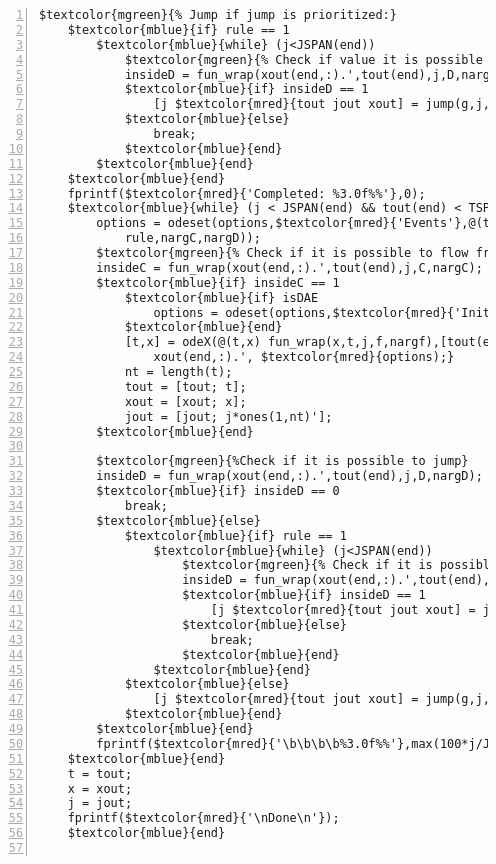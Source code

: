 \begin{Verbatim}[commandchars=\$\{\},numbers=left,numbersep=2pt]
    $textcolor{mgreen}{% Jump if jump is prioritized:} 
    $textcolor{mblue}{if} rule == 1 
        $textcolor{mblue}{while} (j<JSPAN(end)) 
            $textcolor{mgreen}{% Check if value it is possible to jump current position} 
            insideD = fun_wrap(xout(end,:).',tout(end),j,D,nargD); 
            $textcolor{mblue}{if} insideD == 1 
                [j $textcolor{mred}{tout jout xout] = jump(g,j,tout,jout,xout,nargg);} 
            $textcolor{mblue}{else} 
                break; 
            $textcolor{mblue}{end} 
        $textcolor{mblue}{end} 
    $textcolor{mblue}{end} 
    fprintf($textcolor{mred}{'Completed: %3.0f%%'},0); 
    $textcolor{mblue}{while} (j < JSPAN(end) && tout(end) < TSPAN(end)) 
        options = odeset(options,$textcolor{mred}{'Events'},@(t,x) zeroevents(x,t,j,C,D,... 
            rule,nargC,nargD)); 
        $textcolor{mgreen}{% Check if it is possible to flow from current position} 
        insideC = fun_wrap(xout(end,:).',tout(end),j,C,nargC); 
        $textcolor{mblue}{if} insideC == 1 
            $textcolor{mblue}{if} isDAE 
                options = odeset(options,$textcolor{mred}{'InitialSlope'},f(xout(end,:).',tout(end))); 
            $textcolor{mblue}{end} 
            [t,x] = odeX(@(t,x) fun_wrap(x,t,j,f,nargf),[tout(end) tfinal],... 
                xout(end,:).', $textcolor{mred}{options);} 
            nt = length(t); 
            tout = [tout; t]; 
            xout = [xout; x]; 
            jout = [jout; j*ones(1,nt)']; 
        $textcolor{mblue}{end} 
         
        $textcolor{mgreen}{%Check if it is possible to jump} 
        insideD = fun_wrap(xout(end,:).',tout(end),j,D,nargD); 
        $textcolor{mblue}{if} insideD == 0 
            break; 
        $textcolor{mblue}{else} 
            $textcolor{mblue}{if} rule == 1 
                $textcolor{mblue}{while} (j<JSPAN(end)) 
                    $textcolor{mgreen}{% Check if it is possible to jump from current position} 
                    insideD = fun_wrap(xout(end,:).',tout(end),j,D,nargD); 
                    $textcolor{mblue}{if} insideD == 1 
                        [j $textcolor{mred}{tout jout xout] = jump(g,j,tout,jout,xout,nargg);} 
                    $textcolor{mblue}{else} 
                        break; 
                    $textcolor{mblue}{end} 
                $textcolor{mblue}{end} 
            $textcolor{mblue}{else} 
                [j $textcolor{mred}{tout jout xout] = jump(g,j,tout,jout,xout,nargg);} 
            $textcolor{mblue}{end} 
        $textcolor{mblue}{end} 
        fprintf($textcolor{mred}{'\b\b\b\b%3.0f%%'},max(100*j/JSPAN(end),100*tout(end)/TSPAN(end))); 
    $textcolor{mblue}{end} 
    t = tout; 
    x = xout; 
    j = jout; 
    fprintf($textcolor{mred}{'\nDone\n'}); 
    $textcolor{mblue}{end} 
      
\end{Verbatim}  
  
\UndefineShortVerb{\$} 
\UndefineShortVerb{\#} 
 